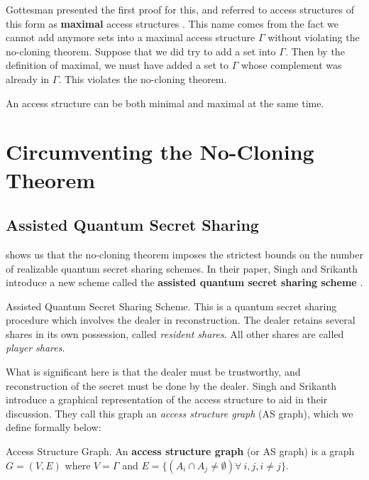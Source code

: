 Gottesman presented the first proof for this, and referred to access structures of this form as \textbf{maximal} access structures \cite{gottesman_theory_2000}. This name comes from the fact we cannot add anymore sets into a maximal access structure $\Gamma$ without violating the no-cloning theorem. Suppose that we did try to add a set into $\Gamma$. Then by the definition of maximal, we must have added a set to $\Gamma$ whose complement was already in $\Gamma$. This violates the no-cloning theorem.

\begin{remark}
    An access structure can be both minimal and maximal at the same time.
\end{remark}

\section{Circumventing the No-Cloning Theorem}

\subsection{Assisted Quantum Secret Sharing}
\label{ssec:aqss}

 shows us that the no-cloning theorem imposes the strictest bounds on the number of realizable quantum secret sharing schemes. In their paper, Singh and Srikanth introduce a new scheme called the \textbf{assisted quantum secret sharing scheme} \cite{singh_assisted_2004}. 

\begin{definition}{Assisted Quantum Secret Sharing Scheme.}
    \label{defn:aqss}
    This is a quantum secret sharing procedure which involves the dealer in reconstruction. The dealer retains several shares in its own possession, called \textit{resident shares}. All other shares are called \textit{player shares}.
\end{definition}

What is significant here is that the dealer must be trustworthy, and reconstruction of the secret must be done by the dealer. Singh and Srikanth introduce a graphical representation of the access structure to aid in their discussion. They call this graph an \textit{access structure graph} (AS graph), which we define formally below:

\begin{definition}{Access Structure Graph.}
    \label{defn:access-structure-graph}
    An \textbf{access structure graph} (or AS graph) is a graph $G = (V,E)$ where $V = \Gamma$ and $E = \{(A_i \cap A_j \neq \emptyset) \forall\:i,j,i\neq j\}$.
\end{definition}

